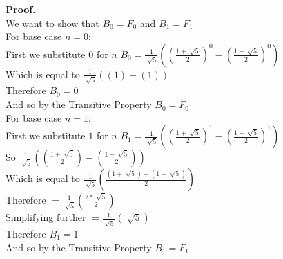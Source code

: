 \documentclass{article}
\begin{document}
{\bf Proof.}
\\
	We want to show that $B_0=F_0$ and $B_1=F_1$
	\\
	For base case $n=0$:
	\\
	First we substitute $0$ for $n$ $B_0=\frac{1}{\sqrt[]{5}}((\frac{1+\sqrt[]{5}}{2})^0-(\frac{1-\sqrt[]{5}}{2})^0)$
	\\
	Which is equal to $\frac{1}{\sqrt[]{5}}((1)-(1))$
	\\
	Therefore $B_0=0$
	\\
	And so by the Transitive Property $B_0=F_0$
	\\
	For base case $n=1$:
	\\
	First we substitute $1$ for $n$ $B_1=\frac{1}{\sqrt[]{5}}((\frac{1+\sqrt[]{5}}{2})^1-(\frac{1-\sqrt[]{5}}{2})^1)$
	\\
	So $\frac{1}{\sqrt[]{5}}((\frac{1+\sqrt[]{5}}{2})-(\frac{1-\sqrt[]{5}}{2}))$
	\\
	Which is equal to $\frac{1}{\sqrt[]{5}}(\frac{(1+\sqrt[]{5})-(1-\sqrt[]{5})}{2})$
	\\
	Therefore $=\frac{1}{\sqrt[]{5}}(\frac{2*\sqrt[]{5}}{2})$
	\\
	Simplifying further $=\frac{1}{\sqrt[]{5}}(\sqrt[]{5})$
	\\
	Therefore $B_1=1$ 
	\\
	And so by the Transitive Property $B_1=F_1$
\end{document}
